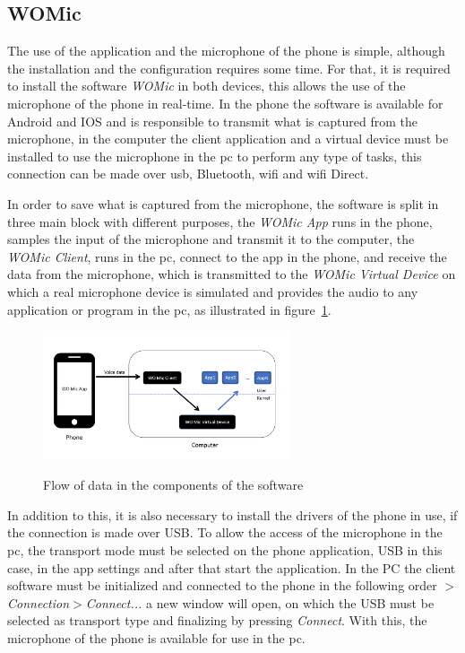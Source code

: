 \subsection*{WOMic}
The use of the application and the microphone of the phone is simple, although the installation and the configuration requires some time. For that, it is required to install the software \textit{WOMic} in both devices, this allows the use of the microphone of the phone in real-time. In the phone the software is available for Android and IOS and is responsible to transmit what is captured from the microphone, in the computer the client application and a virtual device must be installed to use the microphone in the \acrshort{pc} to perform any type of tasks, this connection can be made over \acrshort{usb}, Bluetooth, \acrshort{wifi} and \acrshort{wifi} Direct.

In order to save what is captured from the microphone, the software is split in three main block with different purposes, the \textit{WOMic App} runs in the phone, samples the input of the microphone and transmit it to the computer, the \textit{WOMic Client}, runs in the \acrshort{pc}, connect to the app in the phone, and receive the data from the microphone, which is transmitted to the \textit{WOMic Virtual Device} on which a real microphone device is simulated and provides the audio to any application or program in the \acrshort{pc}, as illustrated in figure~\ref{fig:diagramWOMIC}.

\begin{figure}[]
    \centering
    \includegraphics[width=0.65\textwidth]{Chapters/5CHP/Images/WOMICDiag.png}
    \caption{Flow of data in the components of the software}{\cite{WOMicFREE}}
    \label{fig:diagramWOMIC}
\end{figure}
In addition to this, it is also necessary to install the drivers of the phone in use, if the connection is made over USB. To allow the access of the microphone in the \acrshort{pc}, the transport mode must be selected on the phone application, USB in this case, in the app settings and after that start the application. In the PC the client software must be initialized and connected to the phone in the following order \textit{$>$Connection$>$Connect...} a new window will open, on which the USB must be selected as transport type and finalizing by pressing \textit{Connect}. With this, the microphone of the phone is available for use in the \acrshort{pc}\cite{WOMicFREE}.
